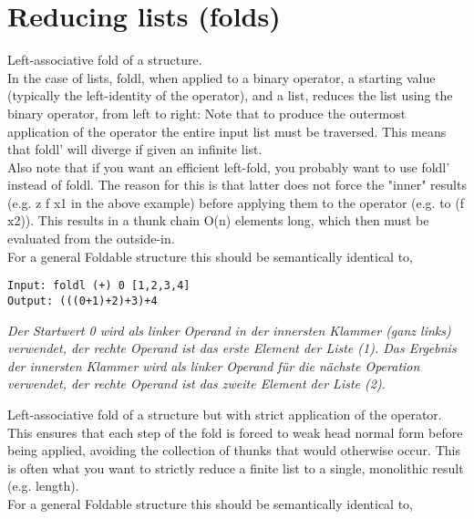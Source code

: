 \section{Reducing lists (folds)}
Left-associative fold of a structure.\\
In the case of lists, foldl, when applied to a binary operator, a starting value (typically the left-identity of the operator), and a list, reduces the list using the binary operator, from left to right:
Note that to produce the outermost application of the operator the entire input list must be traversed. This means that foldl' will diverge if given an infinite list.\\
Also note that if you want an efficient left-fold, you probably want to use foldl' instead of foldl. The reason for this is that latter does not force the "inner" results (e.g. z f x1 in the above example) before applying them to the operator (e.g. to (f x2)). This results in a thunk chain O(n) elements long, which then must be evaluated from the outside-in.\\
For a general Foldable structure this should be semantically identical to,
\example
\begin{lstlisting}
Input: foldl (+) 0 [1,2,3,4] 
Output: (((0+1)+2)+3)+4
\end{lstlisting}
\explain
\textit{Der Startwert 0 wird als linker Operand in der innersten Klammer (ganz links) verwendet, der rechte Operand ist das erste Element der Liste (1). Das Ergebnis der innersten Klammer wird als linker Operand für die nächste Operation verwendet, der rechte Operand ist das zweite Element der Liste (2).}

Left-associative fold of a structure but with strict application of the operator.\\
This ensures that each step of the fold is forced to weak head normal form before being applied, avoiding the collection of thunks that would otherwise occur. This is often what you want to strictly reduce a finite list to a single, monolithic result (e.g. length).\\
For a general Foldable structure this should be semantically identical to,

